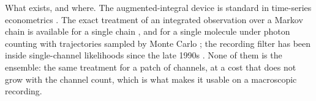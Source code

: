 \begin{appendixbox}
What exists, and where. The augmented-integral device is standard in time-series econometrics \citep{zadrozny1988gaussian}. The exact treatment of an integrated observation over a Markov chain is available for a single chain \citep{bauerle2015exact,blackwell2018integrated}, and for a single molecule under photon counting with trajectories sampled by Monte Carlo \citep{kilic2021extraction}; the recording filter has been inside single-channel likelihoods since the late 1990s \citep{michalek1999identification,venkataramanan2000identification,qin2000hidden}. None of them is the ensemble: the same treatment for a patch of channels, at a cost that does not grow with the channel count, which is what makes it usable on a macroscopic recording.

\end{appendixbox}
